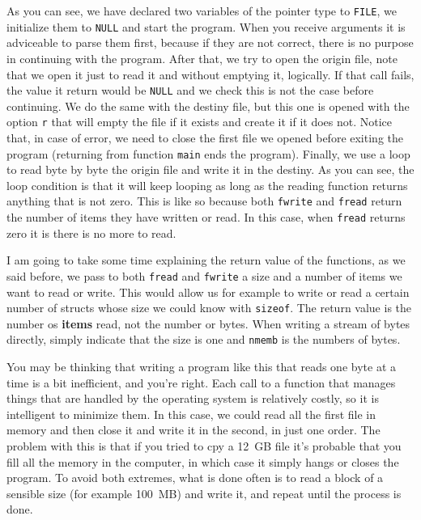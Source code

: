 \documentclass[a4paper]{article}
\begin{document}
As you can see, we have declared two variables of the pointer type to
\verb!FILE!, we initialize them to \verb"NULL" and start the program. When you
receive arguments it is adviceable to parse them first, because if they are not
correct, there is no purpose in continuing with the program. After that, we try
to open the origin file, note that we open it just to read it and without
emptying it, logically. If that call fails, the value it return would be
\verb!NULL! and we check this is not the case before continuing. We do the
same with the destiny
file, but this one is opened with the option \verb!r! that will empty the file
if it exists and create it if it does not.
Notice that, in case of error, we need to close the first file we
opened before exiting the program (returning from function \verb!main! ends the
program). Finally, we use a loop to read byte by byte the origin file and write
it in the destiny. As you can see, the loop condition is that it will keep
looping as long as the reading function returns anything that is not zero.
This is like so because both \verb!fwrite! and \verb!fread! return the number of
items they have written or read. In this case, when \verb!fread! returns zero it
is there is no more to read.

I am going to take some time explaining the return value of the functions, as
we said before, we pass to both \verb!fread! and \verb!fwrite! a size and a
number of items we want to read or write. This would allow us for example to
write or read a certain number of structs whose size we could know with
\verb!sizeof!. The return value is the number os \textbf{items} read, not the
number or bytes. When writing a stream of bytes directly, simply indicate that
the size is one and \verb!nmemb! is the numbers of bytes.

You may be thinking that writing a program like this that reads one byte at a
time is a bit inefficient, and you're right. Each call to a function that
manages things that are handled by the operating system is relatively costly,
so it is intelligent to minimize them. In this case, we could read all the
first file in memory and then close it and write it in the second, in just one
order. The problem with this is that if you tried to cpy a 12~GB file it's
probable that you fill all the memory in the computer, in which case it simply
hangs or closes the program. To avoid both extremes, what is done often is to
read a block of a sensible size (for example 100~MB) and write it, and repeat
until the process is done.
\end{document}
